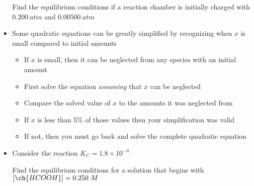 \documentclass[12pt, openany, letterpaper]{memoir}
\begin{document}
\begin{itemize}
	Find the equilibrium conditions if a reaction chamber is initially charged with $0.200~atm$  and $0.00500~atm$ 
	\item Some quadratic equations can be greatly simplified by recognizing when $x$ is small compared to initial amounts
	\begin{itemize}
		\item If $x$ is small, then it can be neglected from any species with an initial amount
		\item First solve the equation \emph{assuming} that $x$ can be neglected
		\item Compare the solved value of $x$ to the amounts it was neglected from
		\item If $x$ is less than $5\%$ of those values then your simplification was valid
		\item If not, then you must go back and solve the complete quadratic equation
	\end{itemize}
	\item Consider the reaction  \hspace{1em} $K_C=1.8\times10^{-4}$
	
	Find the equilibrium conditions for a solution that begins with $\left[\ch{HCOOH}\right]=0.250~M$
\end{itemize}
\end{document}
